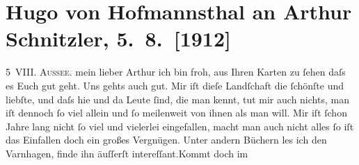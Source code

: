 

         
         \newcommand{\erwaehntePersonen}{Personen: Olga Schnitzler, Karl August von Varnhagen-Ense}
         \newcommand{\erwaehnteOrte}{Orte: Bad Aussee, Wien}
         \newcommand{\erwaehnteWerke}{Werke: Tagebücher}
               \section[Hugo von Hofmannsthal an Arthur Schnitzler, 5. 8. {[}1912{]}]{ Hugo von Hofmannsthal an Arthur Schnitzler, 5. 8. {[}1912{]}}\nopagebreak{}\rehead{ }\begin{ledgroupsized}[t]{13cm}\normalsize\beginnumbering \toendnotes[C]{\smallbreak\pagebreak[2]} 
\toendnotes[C]{\smallbreak}\pstart
           \raggedleft{}{\pb}5 VIII.{ }\textsc{Aussee}.\pend
           \pstart{}mein lieber Arthur\pend\pstart
           ich bin froh, aus Ihren Karten zu ſehen daſs es Euch gut geht. Uns gehts auch gut.
               Mir iſt dieſe Landſchaft die ſchönſte und liebſte, und daſs hie und da Leute ſind,
               die man kennt, tut mir auch nichts, man iſt dennoch ſo viel allein und ſo meilenweit
               von ihnen als man will. Mir iſt ſchon {\pb}Jahre lang nicht ſo viel und
               vielerlei eingefallen, macht man auch nicht alles ſo iſt das Einfallen doch ein
               großes Vergnügen.\pend
           \pstart
           Unter andern Büchern les ich den Varnhagen, finde ihn äuſſerſt intereſſant.\hspace*{1.5em}Kommt doch im

\end{ledgroupsized}
